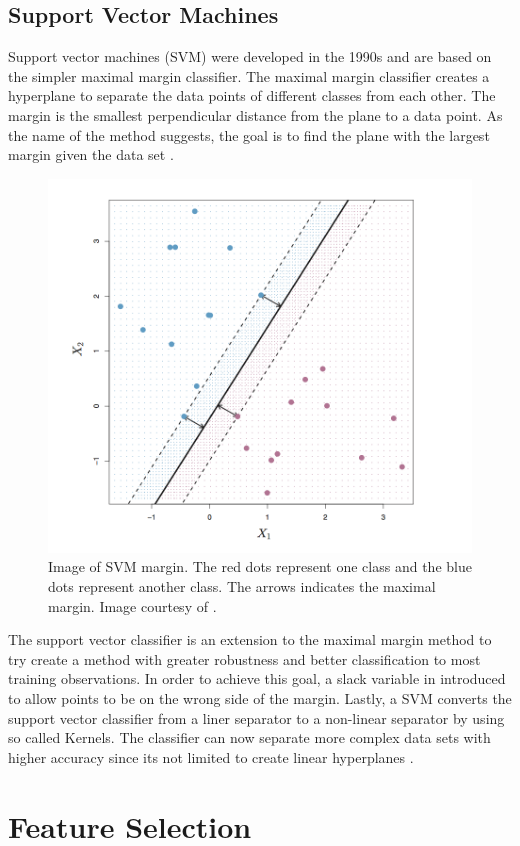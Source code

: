 \subsection{Support Vector Machines}

Support vector machines (SVM) were developed in the 1990s and are based on the simpler maximal margin classifier. The maximal margin classifier creates a hyperplane to separate the data points of different classes from each other. The margin is the smallest perpendicular distance from the plane to a data point. As the name of the method suggests, the goal is to find the plane with the largest margin given the data set \parencite{James:2014}.

\begin{figure}[ht!]
  \centering
  \includegraphics[width=0.7\linewidth]{images/Margin_SVM.png}
  \caption[]
  {\small Image of SVM margin. The red dots represent one class and the blue dots represent another class. The arrows indicates the maximal margin. Image courtesy of \textcite{James:2014}.}
  \label{fig:SVM_Margin}
\end{figure}

The support vector classifier is an extension to the maximal margin method to try create a method with greater robustness and better classification to most training observations. In order to achieve this goal, a slack variable in introduced to allow points to be on the wrong side of the margin. Lastly, a SVM converts the support vector classifier from a liner separator to a non-linear separator by using so called Kernels. The classifier can now separate more complex data sets with higher accuracy since its not limited to create linear hyperplanes \parencite{James:2014}.


\section{Feature Selection}

